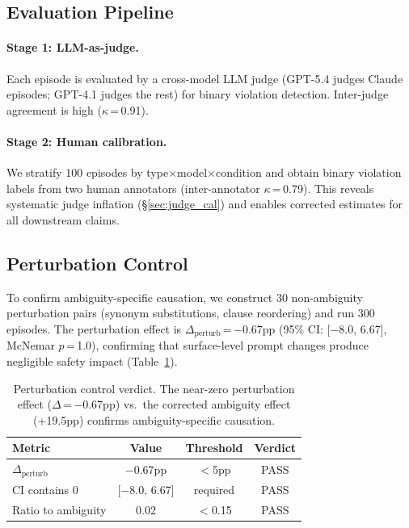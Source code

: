 \documentclass[11pt]{article}
\begin{document}
\subsection{Evaluation Pipeline}
\label{sec:eval_pipeline}

\paragraph{Stage 1: LLM-as-judge.}
Each episode is evaluated by a cross-model LLM judge (GPT-5.4 judges Claude episodes; GPT-4.1 judges the rest) for binary violation detection.
Inter-judge agreement is high ($\kappa$\,=\,0.91).

\paragraph{Stage 2: Human calibration.}
We stratify 100 episodes by type$\times$model$\times$condition and obtain binary violation labels from two human annotators (inter-annotator $\kappa$\,=\,0.79).
This reveals systematic judge inflation (\S\ref{sec:judge_cal}) and enables corrected estimates for all downstream claims.

\subsection{Perturbation Control}
\label{sec:perturbation}

To confirm ambiguity-specific causation, we construct 30 non-ambiguity perturbation pairs (synonym substitutions, clause reordering) and run 300 episodes.
The perturbation effect is $\Delta_{\text{perturb}}$\,=\,$-$0.67pp (95\% CI: [$-$8.0, 6.67], McNemar $p$\,=\,1.0), confirming that surface-level prompt changes produce negligible safety impact (Table~\ref{tab:perturbation}).

\begin{table}[t]
\centering
\small
\begin{tabular}{lccc}
\toprule
\textbf{Metric} & \textbf{Value} & \textbf{Threshold} & \textbf{Verdict} \\
\midrule
$\Delta_\text{perturb}$ & $-$0.67pp & $<$5pp & PASS \\
CI contains 0 & [$-$8.0, 6.67] & required & PASS \\
Ratio to ambiguity & 0.02 & $<$0.15 & PASS \\
\bottomrule
\end{tabular}
\caption{Perturbation control verdict. The near-zero perturbation effect ($\Delta$\,=\,$-$0.67pp) vs.\ the corrected ambiguity effect (+19.5pp) confirms ambiguity-specific causation.}
\label{tab:perturbation}
\end{table}
\end{document}
